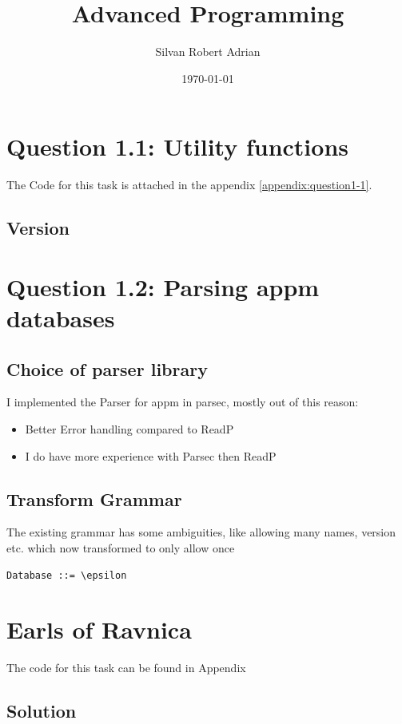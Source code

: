 \documentclass[12pt,a4paper]{article}
\newcommand{\subtitle}[1]{%
  \posttitle{%
    \par\end{center}
    \begin{center}\large#1\end{center}
    \vskip0.5em}%
}
\begin{document}
\title{Advanced Programming}
\subtitle{Exam 2018}

\author{Silvan Robert Adrian}
\date{\today}
	
\maketitle
\tableofcontents

\section{Question 1.1: Utility functions}
The Code for this task is attached in the appendix \ref{appendix:question1-1}.

\subsection{Version}


\section{Question 1.2: Parsing appm databases}
\subsection{Choice of parser library}
I implemented the Parser for appm in parsec, mostly out of this reason:
\begin{itemize}
	\item Better Error handling compared to ReadP
	\item I do have more experience with Parsec then ReadP
\end{itemize}

\subsection{Transform Grammar}
The existing grammar has some ambiguities, like allowing many names, version etc. which now transformed to only allow once
\begin{verbatim}
Database ::= \epsilon

\end{verbatim}


\section{Earls of Ravnica}
The code for this task can be found in Appendix
\subsection{Solution}
\end{document}
